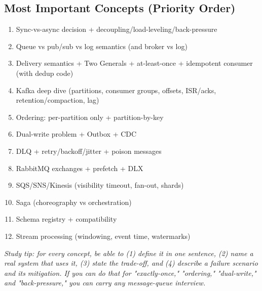 \documentclass[11pt]{article}
\providecommand{\tightlist}{\setlength{\itemsep}{1pt}\setlength{\parskip}{0pt}}
\begin{document}
\subsection{Most Important Concepts (Priority Order)}\label{most-important-concepts-priority-order}

\begin{enumerate}
\def\labelenumi{\arabic{enumi}.}
\tightlist
\item
  Sync-vs-async decision + decoupling/load-leveling/back-pressure
\item
  Queue vs pub/sub vs log semantics (and broker vs log)
\item
  Delivery semantics + Two Generals + at-least-once + idempotent consumer (with dedup code)
\item
  Kafka deep dive (partitions, consumer groups, offsets, ISR/acks, retention/compaction, lag)
\item
  Ordering: per-partition only + partition-by-key
\item
  Dual-write problem + Outbox + CDC
\item
  DLQ + retry/backoff/jitter + poison messages
\item
  RabbitMQ exchanges + prefetch + DLX
\item
  SQS/SNS/Kinesis (visibility timeout, fan-out, shards)
\item
  Saga (choreography vs orchestration)
\item
  Schema registry + compatibility
\item
  Stream processing (windowing, event time, watermarks)
\end{enumerate}

\emph{Study tip: for every concept, be able to (1) define it in one sentence, (2) name a real system that uses it, (3) state the trade-off, and (4) describe a failure scenario and its mitigation. If you can do that for "exactly-once," "ordering," "dual-write," and "back-pressure," you can carry any message-queue interview.}
\end{document}
